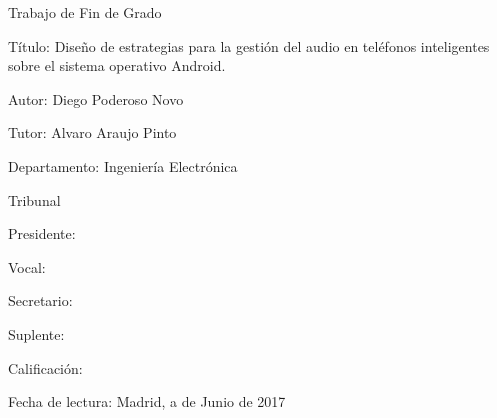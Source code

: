 \newenvironment{xdesc}[2]
  {\begin{description}[leftmargin=#2,labelindent=#1,labelwidth=#1, labelsep=0pt,align=left,style=multiline]}
  {\end{description}}

\begin{center}
	\large {\textsf{Trabajo de Fin de Grado}}
\end{center}

\bigskip

\begin{xdesc}{-1cm}{4cm}
\large{
	\item[Título:] Diseño de estrategias para la gestión del audio en teléfonos inteligentes sobre el sistema operativo Android.
	\item[Autor:] Diego Poderoso Novo
	\item[Tutor:] Alvaro Araujo Pinto
	\item[Departamento:] Ingeniería Electrónica
}
\end{xdesc}

\bigskip
\bigskip
\bigskip
\bigskip
\bigskip
\bigskip

\begin{center}
	\large{\textsf{Tribunal}}
\end{center}

\bigskip

\begin{xdesc}{-1cm}{4cm}
\large{
	\item[Presidente:] 
	\item[Vocal:] 
	\item[Secretario:] 
	\item[Suplente:] 
}
\end{xdesc}

\bigskip
\bigskip
\bigskip
\bigskip
\bigskip
\bigskip
\bigskip
\bigskip
\bigskip

\begin{flushleft}
\large{\textsf{Calificación:}}
\end{flushleft}

\bigskip
\bigskip

\begin{flushleft}
	\large{\textsf{Fecha de lectura:}}
	Madrid, a \hspace{1cm} de Junio de 2017
\end{flushleft}
